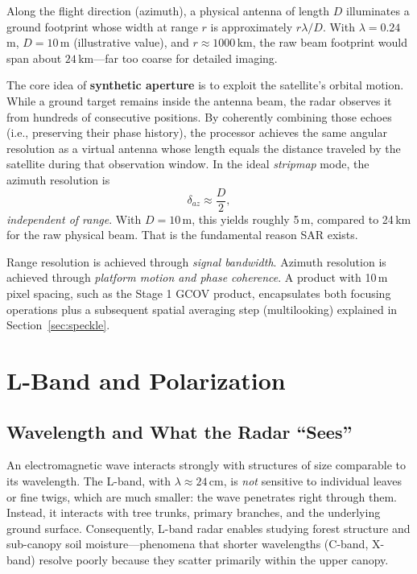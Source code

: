 \documentclass[11pt,a4paper]{article}
\begin{document}
Along the flight direction (azimuth), a physical antenna of length $D$ illuminates a ground footprint whose width at range
$r$ is approximately $r\lambda/D$. With $\lambda = 0.24$\,m, $D = 10$\,m (illustrative value), and $r \approx
1000$\,km, the raw beam footprint would span about $24$\,km---far too coarse for detailed imaging.

The core idea of \textbf{synthetic aperture} is to exploit the satellite's orbital motion. While a ground target remains
inside the antenna beam, the radar observes it from hundreds of consecutive positions. By coherently combining those echoes (i.e.,
preserving their phase history), the processor achieves the same angular resolution as a virtual antenna whose length equals the distance traveled by the satellite during that observation window. In the ideal \emph{stripmap} mode, the azimuth resolution is
\begin{equation}
  \delta_{az} \approx \frac{D}{2},
  \label{eq:res-az}
\end{equation}
\emph{independent of range}. With $D = 10$\,m, this yields roughly 5\,m, compared to 24\,km for the raw physical beam. That is the fundamental reason SAR exists.

\begin{intuicion}
Range resolution is achieved through \emph{signal bandwidth}. Azimuth resolution is achieved through \emph{platform motion
and phase coherence}. A product with 10\,m pixel spacing, such as the Stage 1 GCOV product, encapsulates both focusing operations plus a subsequent spatial averaging step (multilooking) explained in Section~\ref{sec:speckle}.
\end{intuicion}

\section{L-Band and Polarization}
\label{sec:banda-pol}

\subsection{Wavelength and What the Radar ``Sees''}

An electromagnetic wave interacts strongly with structures of size comparable to its wavelength. The L-band, with
$\lambda \approx 24$\,cm, is \emph{not} sensitive to individual leaves or fine twigs, which are much smaller:
the wave penetrates right through them. Instead, it interacts with tree trunks, primary branches, and the underlying ground surface. Consequently, L-band radar enables studying forest structure and sub-canopy soil moisture---phenomena that shorter wavelengths (C-band, X-band) resolve poorly because they scatter primarily within the upper canopy.
\end{document}
